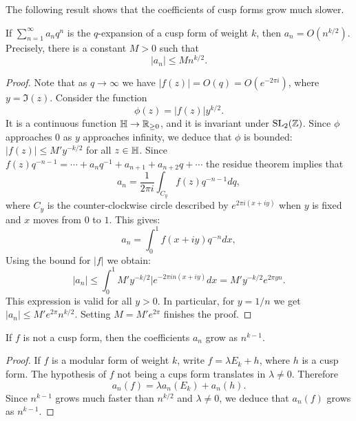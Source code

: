 The following result shows that the coefficients of cusp forms grow much slower.
\begin{theorem}[Hecke]
\label{theorem:growthcusps}
  If $\sum_{n=1}^\infty a_nq^n$ is the $q$-expansion of a  cusp form of weight $k$, then $a_n=O(n^{k/2})$. Precisely, there is a constant $M>0$ such that
\[
|a_n|\leq Mn^{k/2}.
\]
\end{theorem}
\begin{proof}
  Note that as $q\to \infty$ we have $|f(z)|=O(q)=O(e^{-2\pi i})$, where $y=\Im(z)$.  Consider the function
\[
\phi(z)=|f(z)|y^{k/2}.
\]
It is a continuous function $\mathbb{H}\to \mathbb{R}_{\geq 0}$, and it is invariant under $\operatorname{SL}_2(\mathbb{Z})$. Since $\phi$ approaches $0$ as $y$ approaches infinity, we deduce that $\phi$ is bounded: $|f(z)|\leq M' y^{-k/2}$ for all $z\in\mathbb{H}$. Since $f(z)q^{-n-1} = \cdots +a_nq^{-1} + a_{n+1} + a_{n+2} q + \cdots$ the residue theorem implies that
\[
a_n = \frac{1}{2\pi i} \int_{C_y} f(z)q^{-n-1}dq,
\]
where $C_y$ is the counter-clockwise circle described by $e^{2\pi i (x+iy)}$ when $y$ is fixed and $x$ moves from $0$ to $1$. This gives:
\[
a_n=\int_0^1 f(x+iy)q^{-n}dx,
\]
Using the bound for $|f|$ we obtain:
\[
|a_n|\leq \int_0^1 M' y^{-k/2}|e^{-2\pi i n (x+iy)}dx = M'y^{-k/2} e^{2\pi yn}.
\]
This expression is valid for all $y>0$. In particular, for $y=1/n$ we get $|a_n|\leq M'e^{2\pi} n^{k/2}$. Setting $M=M'e^{2\pi}$ finishes the proof.
\end{proof}
\begin{corollary}
\label{corollary:growthmodforms}
  If $f$ is not a cusp form, then the coefficients $a_n$ grow as $n^{k-1}$.
\end{corollary}
\begin{proof}
If $f$ is a modular form of weight $k$, write $f=\lambda E_k + h$, where $h$ is a cusp form. The hypothesis of $f$ not being a cups form translates in $\lambda\neq 0$. Therefore
\[
a_n(f)=\lambda a_n(E_k)+a_n(h).
\]
Since $n^{k-1}$ grows much faster than $n^{k/2}$ and $\lambda\neq 0$, we deduce that $a_n(f)$ grows as $n^{k-1}$.
\end{proof}


